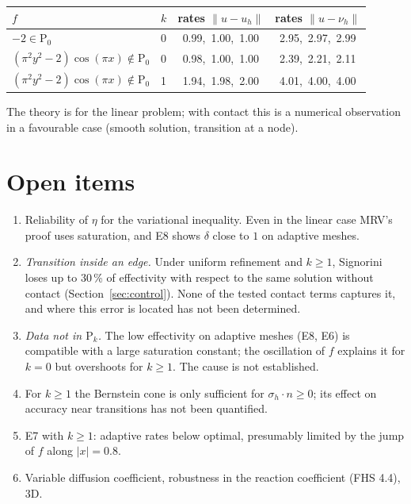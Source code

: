 \documentclass[11pt,a4paper]{article}
\theoremstyle{definition}
\newcommand{\Pk}[1]{\mathrm{P}_{#1}}
\begin{document}
\begin{center}\small
\begin{tabular}{@{}llcc@{}}
\toprule
$f$ & $k$ & rates $\|u-u_h\|$ & rates $\|u-\nu_h\|$ \\
\midrule
$-2\in\Pk0$                          & 0 & 0.99,\ 1.00,\ 1.00 & 2.95,\ 2.97,\ 2.99 \\
$(\pi^2y^2-2)\cos(\pi x)\notin\Pk0$  & 0 & 0.98,\ 1.00,\ 1.00 & 2.39,\ 2.21,\ 2.11 \\
$(\pi^2y^2-2)\cos(\pi x)\notin\Pk0$  & 1 & 1.94,\ 1.98,\ 2.00 & 4.01,\ 4.00,\ 4.00 \\
\bottomrule
\end{tabular}
\end{center}
The theory is for the linear problem; with contact this is a numerical observation in a favourable
case (smooth solution, transition at a node).

\section{Open items}\label{sec:open}

\begin{enumerate}
  \item Reliability of $\eta$ for the variational inequality. Even in the linear case MRV's proof
        uses saturation, and E8 shows $\delta$ close to $1$ on adaptive meshes.
  \item \emph{Transition inside an edge.} Under uniform refinement and $k\ge1$, Signorini loses
        up to 30\,\% of effectivity with respect to the same solution without contact (Section~\ref{sec:control}).
        None of the tested contact terms captures it, and where this error is located has not been
        determined.
  \item \emph{Data not in $\Pk{k}$.} The low effectivity on adaptive meshes (E8, E6) is compatible
        with a large saturation constant; the oscillation of $f$ explains it for $k=0$ but
        overshoots for $k\ge1$. The cause is not established.
  \item For $k\ge1$ the Bernstein cone is only sufficient for $\sigma_h\cdot n\ge0$; its effect on
        accuracy near transitions has not been quantified.
  \item E7 with $k\ge1$: adaptive rates below optimal, presumably limited by the jump of $f$ along
        $|x|=0.8$.
  \item Variable diffusion coefficient, robustness in the reaction coefficient (FHS 4.4), 3D.
\end{enumerate}
\end{document}
